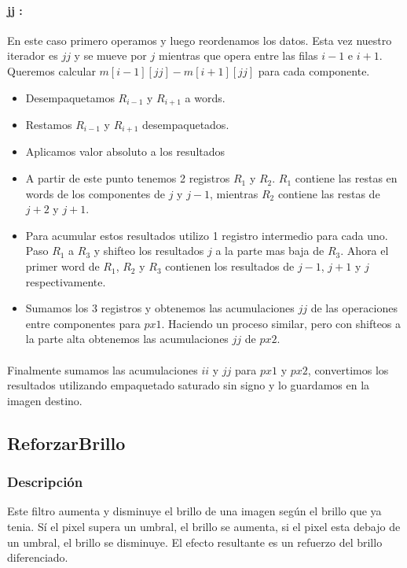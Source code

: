\documentclass[a4paper]{article}
\begin{document}
\paragraph{jj :}En este caso primero operamos y luego reordenamos los datos. Esta vez nuestro iterador es $jj$ y se mueve por $j$ mientras que opera entre las filas $i-1$ e $i+1$. Queremos calcular $m[i-1][jj] - m[i+1][jj]$ para cada componente.

\begin{itemize}
	\item Desempaquetamos $R_{i-1}$ y $R_{i+1}$ a words.
	\item Restamos $R_{i-1}$ y $R_{i+1}$ desempaquetados.
	\item Aplicamos valor absoluto a los resultados
	\item A partir de este punto tenemos 2 registros $R_1$ y $R_2$. $R_1$ contiene las restas en words de los componentes de $j$ y $j-1$, mientras $R_2$ contiene las restas de $j+2$ y $j+1$.
	\item Para acumular estos resultados utilizo 1 registro intermedio para cada uno. Paso $R_1$ a $R_3$ y shifteo los resultados $j$ a la parte mas baja de $R_3$. Ahora el primer word de $R_1$, $R_2$ y $R_3$ contienen los resultados de $j-1$, $j+1$ y $j$ respectivamente.
	\item Sumamos los 3 registros y obtenemos las acumulaciones $jj$ de las operaciones entre componentes para $px1$. Haciendo un proceso similar, pero con shifteos a la parte alta obtenemos las acumulaciones $jj$ de $px2$. 
\end{itemize}

\paragraph{} Finalmente sumamos las acumulaciones $ii$ y $jj$ para $px1$ y $px2$, convertimos los resultados utilizando empaquetado saturado sin signo y lo guardamos en la imagen destino.


\subsection{ReforzarBrillo}

\subsubsection{Descripción}

Este filtro aumenta y disminuye el brillo de una imagen según el brillo que ya tenia. Sí el
pixel supera un umbral, el brillo se aumenta, si el pixel esta debajo de un umbral, el brillo se
disminuye. El efecto resultante es un refuerzo del brillo diferenciado.
\end{document}
